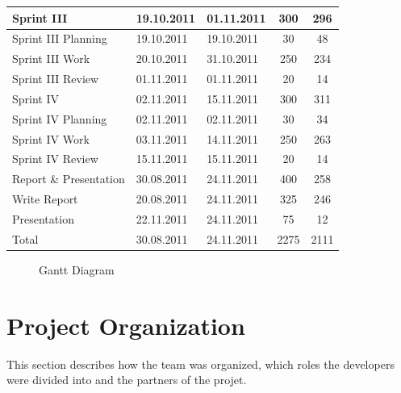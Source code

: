 \begin{table}[!htb]
\begin{tabular}{l l l c c}
	\midrule
	Sprint III & 19.10.2011 & 01.11.2011 & 300 & 296 \\
	\midrule
	Sprint III Planning & 19.10.2011 & 19.10.2011 & 30 & 48 \\
	Sprint III Work & 20.10.2011 & 31.10.2011 & 250 & 234 \\
	Sprint III Review & 01.11.2011 & 01.11.2011 & 20 & 14 \\
	\midrule
	Sprint IV & 02.11.2011 & 15.11.2011 & 300 & 311 \\
	\midrule
	Sprint IV Planning & 02.11.2011 & 02.11.2011 & 30 & 34 \\
	Sprint IV Work & 03.11.2011 & 14.11.2011 & 250 & 263 \\
	Sprint IV Review & 15.11.2011 & 15.11.2011 & 20 & 14 \\
	\midrule
	Report \& Presentation & 30.08.2011 & 24.11.2011 & 400 & 258 \\
	\midrule
	Write Report & 20.08.2011 & 24.11.2011 & 325 & 246 \\
	Presentation & 22.11.2011 & 24.11.2011 & 75 & 12 \\
	\midrule
	Total & 30.08.2011 & 24.11.2011 & 2275 & 2111 \\
	\bottomrule
\end{tabular}
\end{table}

\begin{figure}[!htb]
	\noindent{}
	\caption{Gantt Diagram\label{fig:gantt}}
\end{figure}


\section{Project Organization}
\label{sec:plan:org}
This section describes how the team was organized, which roles the developers were divided into and the partners of the projet.

